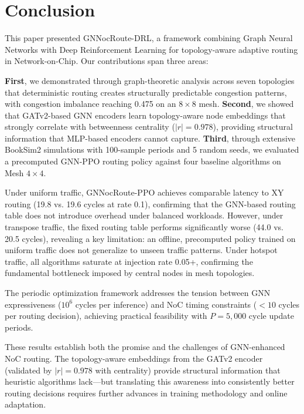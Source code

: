 \section{Conclusion}
\label{sec:conclusion}

This paper presented GNNocRoute-DRL, a framework combining Graph Neural Networks with Deep Reinforcement Learning for topology-aware adaptive routing in Network-on-Chip. Our contributions span three areas:

\textbf{First}, we demonstrated through graph-theoretic analysis across seven topologies that deterministic routing creates structurally predictable congestion patterns, with congestion imbalance reaching 0.475 on an $8\times8$ mesh. \textbf{Second}, we showed that GATv2-based GNN encoders learn topology-aware node embeddings that strongly correlate with betweenness centrality ($|r| = 0.978$), providing structural information that MLP-based encoders cannot capture. \textbf{Third}, through extensive BookSim2 simulations with 100-sample periods and 5 random seeds, we evaluated a precomputed GNN-PPO routing policy against four baseline algorithms on Mesh $4\times4$.

Under uniform traffic, GNNocRoute-PPO achieves comparable latency to XY routing (19.8 vs. 19.6 cycles at rate 0.1), confirming that the GNN-based routing table does not introduce overhead under balanced workloads. However, under transpose traffic, the fixed routing table performs significantly worse (44.0 vs. 20.5 cycles), revealing a key limitation: an offline, precomputed policy trained on uniform traffic does not generalize to unseen traffic patterns. Under hotspot traffic, all algorithms saturate at injection rate 0.05+, confirming the fundamental bottleneck imposed by central nodes in mesh topologies.

The periodic optimization framework addresses the tension between GNN expressiveness ($10^6$ cycles per inference) and NoC timing constraints ($<10$ cycles per routing decision), achieving practical feasibility with $P = 5,000$ cycle update periods.

These results establish both the promise and the challenges of GNN-enhanced NoC routing. The topology-aware embeddings from the GATv2 encoder (validated by $|r| = 0.978$ with centrality) provide structural information that heuristic algorithms lack---but translating this awareness into consistently better routing decisions requires further advances in training methodology and online adaptation.


